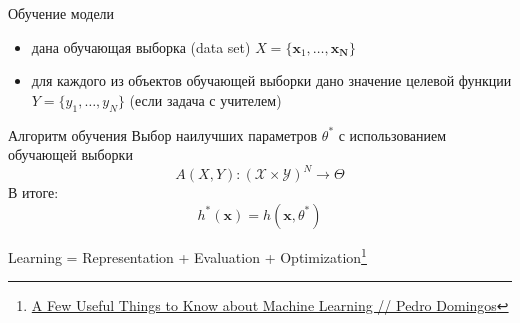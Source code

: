 \documentclass[aspectratio=169]{beamer}
\begin{document}
\begin{frame}{Обучение модели}

\begin{itemize}
\item дана обучающая выборка (data set) $X = \{{\mathbf{x}_1, \ldots, \mathbf{x_N}}\}$
\item для каждого из объектов обучающей выборки дано значение целевой функции $Y = \{y_1, \ldots, y_N\}$ (если задача с учителем)
\end{itemize}

\begin{block}{Алгоритм обучения}
Выбор наилучших параметров $\theta^*$ с использованием обучающей выборки
\[
A(X, Y): (\mathcal{X} \times \mathcal{Y})^N \rightarrow \Theta
\]
В итоге:
\[
h^*(\mathbf{x}) = h(\mathbf{x}, \theta^*)
\]
\end{block}

\end{frame}

\begin{frame}{}

\begin{center}
{\large
Learning = Representation + Evaluation + Optimization\footnote{\href{https://homes.cs.washington.edu/~pedrod/papers/cacm12.pdf}{A Few Useful Things to Know about Machine Learning // Pedro Domingos}}
}
\end{center}

\end{frame}
\end{document}
